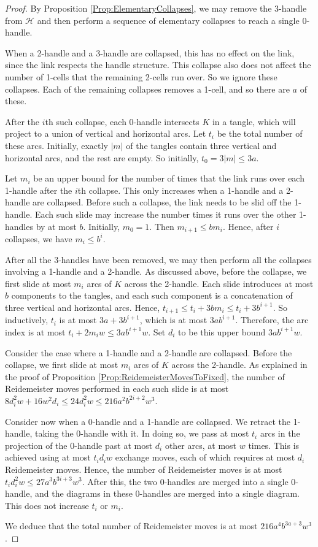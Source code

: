 \documentclass[oneside]{amsart}
\numberwithin{equation}{section}
\theoremstyle{plain}
\theoremstyle{definition}
\newcommand{\calH}{\mathcal{H}}
\begin{document}
\begin{proof}
By Proposition \ref{Prop:ElementaryCollapses}, we may remove the 3-handle from $\calH$ and
then perform a sequence of elementary collapses to reach a single 0-handle.

When a 2-handle and a 3-handle are collapsed, this has no effect on the link, since the link
respects the handle structure. This collapse also does not affect the number of 1-cells
that the remaining 2-cells run over. So we ignore these collapses. Each of the
remaining collapses removes a 1-cell, and so there are $a$ of these. 

After the $i$th such collapse, each 0-handle intersects $K$ in a tangle, which will project to a union
of vertical and horizontal arcs. Let $t_i$ be the total number of these arcs. 
Initially, exactly $|m|$ of the tangles contain three vertical and horizontal arcs,
and the rest are empty. So initially, $t_0 = 3|m| \leq 3a$.

Let $m_i$ be an upper bound for the number of times that the link runs
over each 1-handle after the $i$th collapse. This only increases when a 1-handle and a 2-handle are collapsed.
Before such a collapse,
the link needs to be slid off the 1-handle. Each such slide may increase the number
times it runs over the other 1-handles by at most $b$. Initially, $m_0 = 1$. Then $m_{i+1} \leq b m_i$. Hence, after $i$ collapses,
we have $m_i \leq b^i$.

After all the 3-handles have been removed, we may then perform all the collapses involving
a 1-handle and a 2-handle. As discussed above, before the collapse, we first slide at most $m_i$ arcs of $K$ across
the 2-handle. Each slide introduces at most $b$ components to the tangles, and each such component
is a concatenation of three vertical and horizontal arcs.
Hence, $t_{i+1} \leq t_i + 3bm_i \leq t_i + 3b^{i+1}$. So inductively, $t_i$ is at most $3a + 3b^{i+1}$, which is at most $3ab^{i+1}$.
Therefore, the arc index is at most $t_i + 2m_iw \leq 3ab^{i+1}w$. Set $d_i$ to be this upper bound $3ab^{i+1}w$.

Consider the case where a 1-handle and a 2-handle are collapsed. Before the collapse, we first slide at most $m_i$ arcs of $K$ across
the 2-handle. As explained in the proof of Proposition \ref{Prop:ReidemeisterMovesToFixed}, the number of Reidemeister moves performed
in each such slide is at most $8d_i^2w + 16 w^2  d_i\leq 24 d_i^2 w \leq 216a^2b^{2i+2}w^3$.

Consider now when a 0-handle and a 1-handle are collapsed. We retract the 1-handle, taking the 0-handle with it.
In doing so, we pass at most $t_i$ arcs in the projection of the 0-handle past at most $d_i$ other arcs,
at most $w$ times. This is achieved using at most $t_id_iw$ exchange moves, each of which requires at most $d_i$
Reidemeister moves. Hence, the number of Reidemeister moves is at most $t_i d_i^2 w \leq 27a^3b^{3i+3} w^3$.
After this, the two 0-handles are merged into a single 0-handle, and the diagrams in these 0-handles
are merged into a single diagram. This does not increase $t_i$ or $m_i$.

We deduce that the total number of Reidemeister moves is at most $216a^4b^{3a+3}w^3$.
\end{proof}
\end{document}
